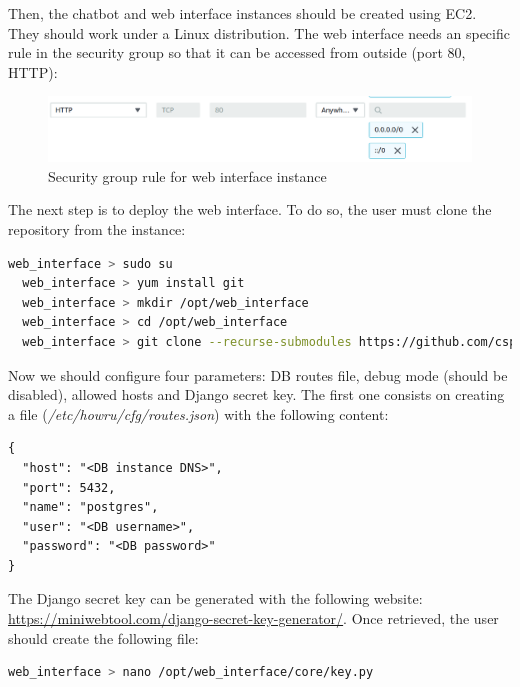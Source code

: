 \documentclass[12pt,english]{article}
\begin{document}
Then, the chatbot and web interface instances should be created using EC2. They should work under a Linux distribution. The web interface needs an specific rule in the security group so that it can be accessed from outside (port 80, HTTP):

\begin{figure}[H]
  \centering
  \includegraphics[width=\textwidth]{web_int_sg.png}
  \caption{Security group rule for web interface instance}
\end{figure}

The next step is to deploy the web interface. To do so, the user must clone the repository from the instance:

\begin{lstlisting}[mathescape=false, language=bash, caption={Commands to download web interface repository}, captionpos=b]
  web_interface > sudo su
  web_interface > yum install git
  web_interface > mkdir /opt/web_interface
  web_interface > cd /opt/web_interface
  web_interface > git clone --recurse-submodules https://github.com/csp98/howru_web_interface.git .
\end{lstlisting}

Now we should configure four parameters: DB routes file, debug mode (should be disabled), allowed hosts and Django secret key. The first one consists on creating a file (\emph{/etc/howru/cfg/routes.json}) with the following content:

\begin{lstlisting}[caption={Routes file}, captionpos=b]
{
  "host": "<DB instance DNS>",
  "port": 5432,
  "name": "postgres",
  "user": "<DB username>",
  "password": "<DB password>"
}
\end{lstlisting}

The Django secret key can be generated with the following website: \\\href{https://miniwebtool.com/django-secret-key-generator/}{https://miniwebtool.com/django-secret-key-generator/}. Once retrieved, the user should create the following file:

\begin{lstlisting}[mathescape=false, language=bash, caption={Command to create Django key file}, captionpos=b]
  web_interface > nano /opt/web_interface/core/key.py
\end{lstlisting}
\end{document}
